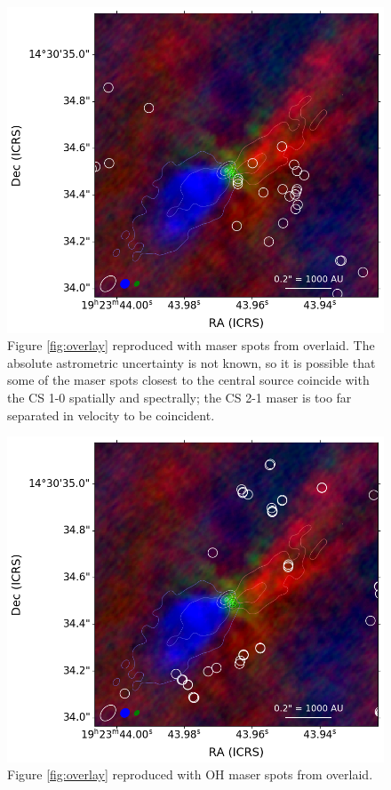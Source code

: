 \documentclass[twocolumn]{aastex62}
\begin{document}
\begin{figure}[htp]
    \includegraphics[width=\textwidth]{figures/W51e2e_sio_outflow_with_CS_contours_and_ch3oh.png}
    \caption{Figure \ref{fig:overlay} reproduced with \methanol maser spots from \citet{Etoka2012a}
    overlaid.  The absolute astrometric uncertainty is not known, so it is possible that some of the
    maser spots closest to the central source coincide with the CS 1-0 spatially and spectrally;
    the CS 2-1 maser is too far separated in velocity to be coincident.
    }
    \label{fig:methanoloverlay}
\end{figure}

\begin{figure}[htp]
    \includegraphics[width=\textwidth]{figures/W51e2e_sio_outflow_with_CS_contours_and_OH.png}
    \caption{Figure \ref{fig:overlay} reproduced with OH maser spots from \citet{Fish2007a}
    overlaid.
    }
    \label{fig:ohoverlay}
\end{figure}
\end{document}
